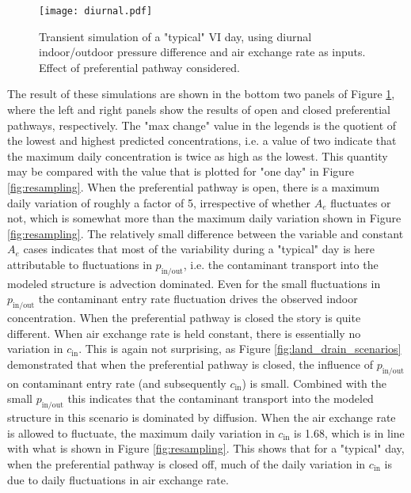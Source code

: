 \begin{figure}
  \centering
 \texttt{[image: diurnal.pdf]}
 \caption{Transient simulation of a "typical" VI day, using diurnal indoor/outdoor pressure difference and air exchange rate as inputs. Effect of preferential pathway considered.}\label{fig:diurnal}
\end{figure}

The result of these simulations are shown in the bottom two panels of Figure \ref{fig:diurnal}, where the left and right panels show the results of open and closed preferential pathways, respectively.
The "max change" value in the legends is the quotient of the lowest and highest predicted concentrations, i.e. a value of two indicate that the maximum daily concentration is twice as high as the lowest.
This quantity may be compared with the value that is plotted for "one day" in Figure \ref{fig:resampling}.
When the preferential pathway is open, there is a maximum daily variation of roughly a factor of 5, irrespective of whether $A_e$ fluctuates or not, which is somewhat more than the maximum daily variation shown in Figure \ref{fig:resampling}.
The relatively small difference between the variable and constant $A_e$ cases indicates that most of the variability during a "typical" day is here attributable to fluctuations in $p_\mathrm{in/out}$, i.e. the contaminant transport into the modeled structure is advection dominated.
Even for the small fluctuations in $p_\mathrm{in/out}$ the contaminant entry rate fluctuation drives the observed indoor concentration.
When the preferential pathway is closed the story is quite different.
When air exchange rate is held constant, there is essentially no variation in $c_\mathrm{in}$.
This is again not surprising, as Figure \ref{fig:land_drain_scenarios} demonstrated that when the preferential pathway is closed, the influence of $p_\mathrm{in/out}$ on contaminant entry rate (and subsequently $c_\mathrm{in}$) is small.
Combined with the small $p_\mathrm{in/out}$ this indicates that the contaminant transport into the modeled structure in this scenario is dominated by diffusion.
When the air exchange rate is allowed to fluctuate, the maximum daily variation in $c_\mathrm{in}$ is 1.68, which is in line with what is shown in Figure \ref{fig:resampling}.
This shows that for a "typical" day, when the preferential pathway is closed off, much of the daily variation in $c_\mathrm{in}$ is due to daily fluctuations in air exchange rate.\par

